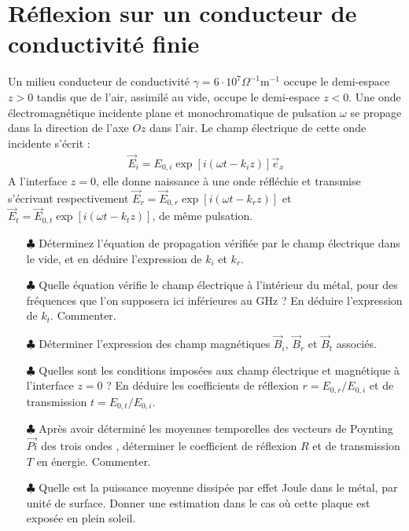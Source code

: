 \documentclass{report}
\begin{document}
\newpage

\section*{Réflexion sur un conducteur de conductivité finie}

Un milieu conducteur de conductivité $\gamma=6\cdot10^7\Omega^{-1}$m$^{-1}$ occupe le demi-espace $z>0$ tandis que de l'air, assimilé au vide, occupe le demi-espace $z<0$. Une onde électromagnétique incidente plane et monochromatique de pulsation $\omega$ se propage dans la direction de l'axe $Oz$ dans l'air. Le champ électrique de cette onde incidente s'écrit :
\begin{align*}
	\vec{E}_i=E_{0,i}\exp[i(\omega t-k_iz)]\vec{e}_x
\end{align*}
A l'interface $z=0$, elle donne naissance à une onde réfléchie et transmise s'écrivant respectivement $\vec{E}_r=\vec{E}_{0,r}\exp[i(\omega t-k_rz)]$ et $\vec{E}_t=\vec{E}_{0,t}\exp[i(\omega t-k_tz)]$, de même pulsation.

\begin{itemize}
	
	\item[$\clubsuit$] Déterminez l'équation de propagation vérifiée par le champ électrique dans le vide, et en déduire l'expression de $k_i$ et $k_r$. 
	
	\item[$\clubsuit$] Quelle équation vérifie le champ électrique à l'intérieur du métal, pour des fréquences que l'on supposera ici inférieures au GHz ? En déduire l'expression de $k_t$. Commenter. 
	
	\item[$\clubsuit$] Déterminer l'expression des champ magnétiques $\vec{B}_i$, $\vec{B}_r$ et $\vec{B}_t$ associés.
	
	\item[$\clubsuit$] Quelles sont les conditions imposées aux champ électrique et magnétique à l'interface $z=0$ ? En déduire les coefficients de réflexion $r=E_{0,r}/E_{0,i}$ et de transmission $t=E_{0,t}/E_{0,i}$.
	
	\item[$\clubsuit$] Après avoir déterminé les moyennes temporelles des vecteurs de Poynting $\vec{Pi}$ des trois ondes	, déterminer le coefficient de réflexion $R$ et de transmission $T$ en énergie. Commenter.
	
	\item[$\clubsuit$] Quelle est la puissance moyenne dissipée par effet Joule dans le métal, par unité de surface. Donner une estimation dans le cas où cette plaque est exposée en plein soleil.
	
\end{itemize}
\end{document}
